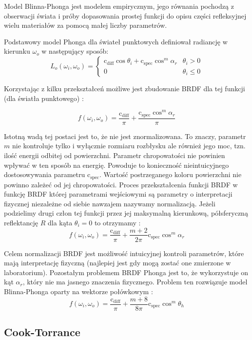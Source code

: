 \documentclass[../main.tex]{subfiles}
\newcommand{\cdiff}{\text{c}_{\text{diff}}}
\newcommand{\cspec}{\text{c}_{\text{spec}}}
\begin{document}
Model Blinna-Phonga jest modelem empirycznym, jego równania pochodzą z obserwacji świata i próby dopasowania prostej funkcji do opisu części refleksyjnej wielu materiałów za pomocą małej liczby parametrów.

Podstawowy model Phonga dla świateł punktowych definiował radiancję w kierunku $\omega_o$ w następujący sposób:
\[
L_{o}(\omega_i, \omega_o) = \begin{cases}
\cdiff \cos\theta_i + \cspec \cos^{m}{\alpha_r} & \theta_i > 0 \\
0 & \theta_i \leq 0
\end{cases}
\]

Korzystając z kilku przekształceń możliwe jest zbudowanie BRDF dla tej funkcji (dla światła punktowego) \cite{RealTimeRendering2008}:

\[
f(\omega_i, \omega_o) = \frac{\cdiff}{\pi} + \frac{\cspec \cos^{m} \alpha_r}{\pi}
\]

Istotną wadą tej postaci jest to, że nie jest znormalizowana. To znaczy, parametr $m$ nie kontroluje tylko i wyłącznie rozmiaru rozbłysku ale również jego moc, tzn. ilość energii odbitej od powierzchni. Parametr chropowatości nie powinien wpływać w ten sposób na energię. Powoduje to konieczność nieintuicyjnego dostosowywania parametru $\cspec$. Wartość postrzeganego koloru powierzchni nie powinno zależeć od jej chropowatości. Proces przekształcenia funkcji BRDF w funkcję BRDF której parametrami wejściowymi są parametry o interpretacji fizycznej niezależne od siebie nawzajem nazywamy normalizacją.  Jeżeli podzielimy drugi człon tej funkcji przez jej maksymalną kierunkową, półsferyczną reflektancję $R$ dla kąta $\theta_i = 0$ to otrzymamy \cite{RealTimeRendering2008}:
\[
  f(\omega_i, \omega_o) = \frac{\cdiff}{\pi} + \frac{m+2}{2\pi} {\cspec \cos^{m} \alpha_r}
\]

Celem normalizacji BRDF jest możliwość intuicyjnej kontroli parametrów, które mają interpretację fizyczną (najlepiej jest gdy mogą zostać one zmierzone w laboratorium). Pozostałym problemem BRDF Phonga jest to, że wykorzystuje on kąt $\alpha_r$, który nie ma jasnego znaczenia fizycznego. Problem ten rozwiązuje model Blinna-Phonga oparty na wektorze połówkowym \cite{RealTimeRendering2008}:
\[
  f(\omega_i, \omega_o) = \frac{\cdiff}{\pi} + \frac{m+8}{8\pi} {\cspec \cos^{m} \theta_h}
\]

\subsection{Cook-Torrance}
\end{document}
